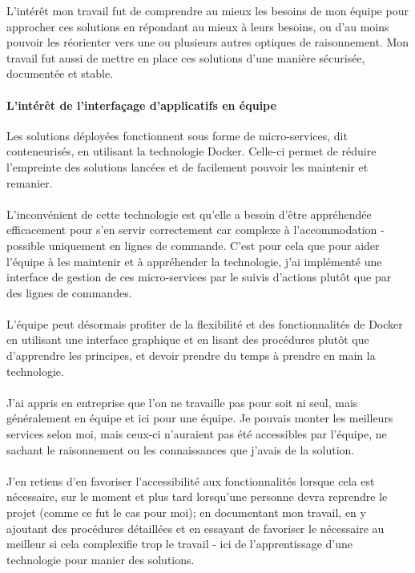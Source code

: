 \noindent L'intérêt mon travail fut de comprendre au mieux les besoins de mon équipe pour approcher ces solutions en répondant au mieux à leurs besoins, ou d'au moins pouvoir les réorienter vers une ou plusieurs autres optiques de raisonnement. Mon travail fut aussi de mettre en place ces solutions d'une manière sécurisée, documentée et stable.

\paragraph{L'intérêt de l'interfaçage d'applicatifs en équipe}

Les solutions déployées fonctionnent sous forme de micro-services, dit conteneurisés, en utilisant la technologie Docker. Celle-ci permet de réduire l'empreinte des solutions lancées et de facilement pouvoir les maintenir et remanier.%
\\ \\
L'inconvénient de cette technologie est qu'elle a besoin d'être appréhendée efficacement pour s'en servir correctement car complexe à l'accommodation - possible uniquement en lignes de commande. C'est pour cela que pour aider l'équipe à les maintenir et à appréhender la technologie, j'ai implémenté une interface de gestion de ces micro-services par le suivis d'actions plutôt que par des lignes de commandes.
\\ \\
L'équipe peut désormais profiter de la flexibilité et des fonctionnalités de Docker en utilisant une interface graphique et en lisant des procédures plutôt que d'apprendre les principes, et devoir prendre du temps à prendre en main la technologie.
\\ \\
J'ai appris en entreprise que l'on ne travaille pas pour soit ni seul, mais généralement en équipe et ici pour une équipe. Je pouvais monter les meilleurs services selon moi, mais ceux-ci n'auraient pas été accessibles par l'équipe, ne sachant le raisonnement ou les connaissances que j'avais de la solution.
\\ \\
J'en retiens d'en favoriser l'accessibilité aux fonctionnalités lorsque cela est nécessaire, sur le moment et plus tard lorsqu'une personne devra reprendre le projet (comme ce fut le cas pour moi); en documentant mon travail, en y ajoutant des procédures détaillées et en essayant de favoriser le nécessaire au meilleur si cela complexifie trop le travail - ici de l'apprentissage d'une technologie pour manier des solutions.

